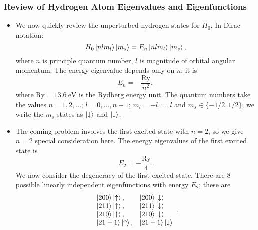 \documentclass[11pt, a4paper]{article}
\newcommand{\ua}{\uparrow}  %
\newcommand{\da}{\downarrow}  %
\begin{document}
\subsubsection{Review of Hydrogen Atom Eigenvalues and Eigenfunctions}
\begin{itemize}
	\item We now quickly review the unperturbed hydrogen states for $ H_{0} $. In Dirac notation:
	\begin{equation*}
		H_{0}\ket{nlm_{l}}\ket{m_{s}} = E_{n} \ket{nlm_{l}}\ket{m_{s}},
	\end{equation*}
	where $ n $ is principle quantum number, $ l $ is magnitude of orbital angular momentum.  The energy eigenvalue depends only on $ n $; it is
	\begin{equation*}
		E_{n} = - \frac{\mathrm{Ry}}{n^{2}},
	\end{equation*}
	where $\mathrm{Ry} = \SI{13.6}{\electronvolt} $ is the Rydberg energy unit. The quantum numbers take the values $ n = 1, 2, \ldots $; $ l = 0, \ldots, n-1 $; $ m_{l} = -l, \ldots, l $ and $ m_{s} \in \{-1/2, 1/2\} $; we write the $ m_{s} $ states as $ \ket{\da} $ and $ \ket{\da} $. 
	
	\item The coming problem involves the first excited state with $ n = 2 $, so we give $ n = 2 $ special consideration here. The energy eigenvalues of the first excited state is
	\begin{equation*}
		E_{2} = - \frac{\mathrm{Ry}}{4}.
	\end{equation*}
	We now consider the degeneracy of the first excited state. There are 8 possible linearly independent eigenfunctions with energy $ E_{2} $; these are
	\[
	\begin{array}{ll}
		\ket{200}\ket{\ua}, & \ket{200}\ket{\da}\\
		\ket{211}\ket{\ua}, & \ket{211}\ket{\da}\\
		\ket{210}\ket{\ua}, & \ket{210}\ket{\da}\\
		\ket{21-1}\ket{\ua}, & \ket{21-1}\ket{\da}
	\end{array}.
	\]
	

\end{itemize}
\end{document}
